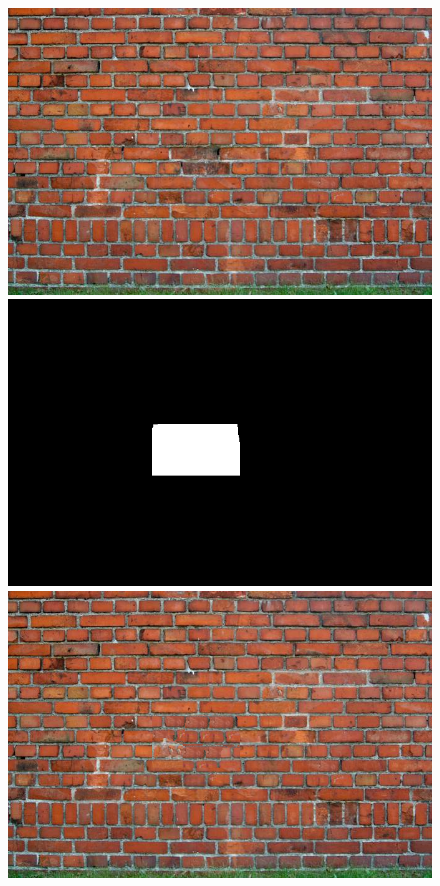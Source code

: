\documentclass[a4paper, 10pt]{article}
\begin{document}
\begin{figure}
\begin{minipage}{.4\textwidth}
\centering
\includegraphics[scale=0.15]{images/wall3.jpg}
\end{minipage}%
\begin{minipage}{.4\textwidth}
\centering
\includegraphics[scale=0.15]{mask_wall3_29.png}
\end{minipage}%
\begin{minipage}{.4\textwidth}
\centering
\includegraphics[scale=0.15]{wall3_inpainted29.png}
\end{minipage}%
\end{figure}
\end{document}

